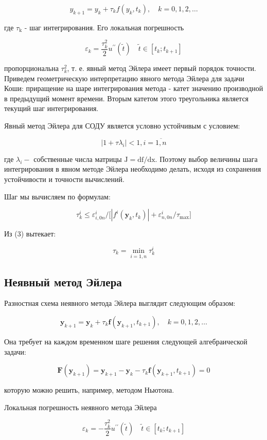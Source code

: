 \documentclass[a4paper]{article}
\begin{document}
{{{{{{{{$$
y_{k+1}=y_{k}+\tau_{k} f\left(y_{k}, t_{k}\right), \quad k=0,1,2, \ldots
$$

где $\tau_{\mathrm{k}}$ - шаг интегрирования. Его локальная погрешность

$$
\varepsilon_{k}=\frac{\tau_{k}^{2}}{2} u^{\prime \prime}(\tilde{t}) \quad \tilde{t} \in\left[t_{k} ; t_{k+1}\right]
$$

пропорциональна $\tau_{k}^{2}$, т. е. явный метод Эйлера имеет первый порядок точности. Приведем геометрическую интерпретацию явного метода Эйлера для задачи Коши: приращение на шаре интегрирования метода - катет значению производной в предыдущий момент времени. Вторым катетом этого треугольника является текущий шаг интегрирования.

Явный метод Эйлера для СОДУ является условно устойчивым с условием:

$$
\left|1+\tau \lambda_{i}\right|<1, i=\overline{1, n}
$$

где $\lambda_{i}-$ собственные числа матрицы $\mathrm{J}=\mathrm{df} / \mathrm{dx}$. Поэтому выбор величины шага интегрирования в явном методе Эйлера необходимо делать, исходя из сохранения устойчивости и точности вычислений.

Шаг мы вычисляем по формулам:

$$
\tau_{k}^{i}\leq\varepsilon_{i,0n}^{i}/ \big[|f^{i}(\mathbf{y}_{k},t_{k})|+\varepsilon_{n,0n}^{i}/\tau_{\mathrm{max}}\big]
$$

Из (3) вытекает:

$$
\tau_{k}=\min _{i=1, n} \tau_{k}^{i}
$$

\subsection{Неявный метод Эйлера}
Разностная схема неявного метода Эйлера выглядит следующим образом:

$$
\mathbf{y}_{k+1}=\mathbf{y}_{k}+\tau_{k} \mathbf{f}\left(\mathbf{y}_{k+1}, t_{k+1}\right), \quad k=0,1,2, \ldots
$$

Она требует на каждом временном шаге решения следующей алгебраической задачи:

$$
\mathbf{F}\left(\mathbf{y}_{k+1}\right)=\mathbf{y}_{k+1}-\mathbf{y}_{k}-\tau_{k} \mathbf{f}\left(\mathbf{y}_{k+1}, t_{k+1}\right)=0
$$

которую можно решить, например, методом Ньютона.

Локальная погрешность неявного метода Эйлера

$$
\varepsilon_{k}=-\frac{\tau_{k}^{2}}{2} u^{\prime \prime}(\tilde{t}) \quad \tilde{t} \in\left[t_{k} ; t_{k+1}\right]
$$

}}}}}}}}
\end{document}
